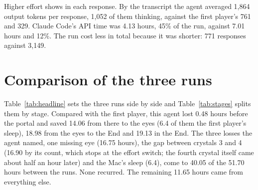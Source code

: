 \documentclass[11pt,a4paper]{article}
\begin{document}
Higher effort shows in each response. By the transcript the agent averaged 1,864 output tokens per response, 1,052 of them thinking, against the first player's 761 and 329. Claude Code's API time was 4.13 hours, 45\% of the run, against 7.01 hours and 12\%. The run cost less in total because it was shorter: 771 responses against 3,149.

\section{Comparison of the three runs}
\label{sec:compare}

Table~\ref{tab:headline} sets the three runs side by side and Table~\ref{tab:stages} splits them by stage. Compared with the first player, this agent lost 0.48 hours before the portal and saved 14.06 from there to the eyes (6.4 of them the first player's sleep), 18.98 from the eyes to the End and 19.13 in the End. The three losses the agent named, one missing eye (16.75 hours), the gap between crystals 3 and 4 (16.90 by its count, which stops at the effort switch; the fourth crystal itself came about half an hour later) and the Mac's sleep (6.4), come to 40.05 of the 51.70 hours between the runs. None recurred. The remaining 11.65 hours came from everything else.
\end{document}
